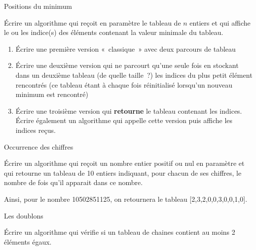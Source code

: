 	\begin{Exercice}{Positions du minimum}
		
		Écrire un algorithme qui reçoit en paramètre le tableau
		 de $n$ entiers et qui
		affiche le ou les indice(s) des éléments 
		contenant la valeur minimale du tableau.
	
		\begin{enumerate}[label=\alph*)]
		\item 
			Écrire une première version «~classique~» avec deux parcours de tableau
		\item
			Écrire une deuxième version qui ne parcourt qu’une seule fois 
			 en
			stockant dans un deuxième tableau (de quelle taille~?)
			les indices du plus petit élément
			rencontrés (ce tableau étant à chaque fois réinitialisé lorsqu’un
			nouveau minimum est rencontré)
		\item
			Écrire une troisième version qui \textbf{retourne} 
			le tableau contenant les indices.
			Écrire également un algorithme 
			qui appelle cette version puis affiche les indices reçus. 
		\end{enumerate}
	\end{Exercice}
	
	\begin{Exercice}{Occurrence des chiffres}
		
		Écrire un algorithme qui reçoit un nombre entier positif ou nul en
		paramètre et qui retourne un tableau de 10 entiers indiquant, pour
		chacun de ses chiffres, le nombre de fois qu’il apparait dans ce
		nombre.  
		
		Ainsi, pour le nombre 10502851125, on retournera le tableau
		[2,3,2,0,0,3,0,0,1,0].
	
	\end{Exercice}
	
	\begin{Exercice}{Les doublons}
		
		Écrire un algorithme qui vérifie 
		si un tableau de chaines
		contient au moins 2 éléments égaux.
	\end{Exercice}	
	\bigskip
	
